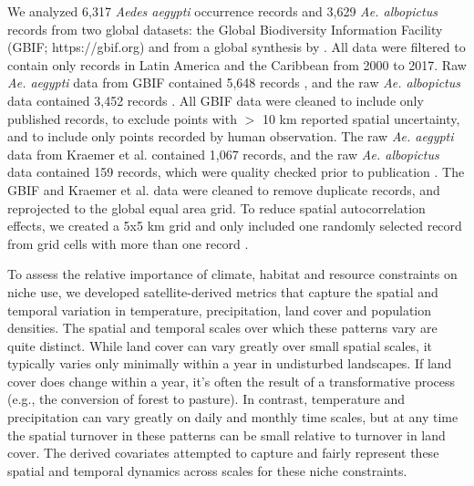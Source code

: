 We analyzed 6,317 \textit{Aedes aegypti} occurrence records and 3,629 \textit{Ae. albopictus} records from two global datasets: the Global Biodiversity Information Facility (GBIF; https://gbif.org) and from a global synthesis by \cite{Kraemer2015-sm}. All data were filtered to contain only records in Latin America and the Caribbean from 2000 to 2017. Raw \textit{Ae. aegypti} data from GBIF contained 5,648 records \cite{Gbif2018-ae}, and the raw \textit{Ae. albopictus} data contained 3,452 records \cite{Gbif2018-aa}. All GBIF data were cleaned to include only published records, to exclude points with $>$ 10 km reported spatial uncertainty, and to include only points recorded by human observation. The raw \textit{Ae. aegypti} data from Kraemer et al. contained 1,067 records, and the raw \textit{Ae. albopictus} data contained 159 records, which were quality checked prior to publication \cite{Kraemer2015-sm}. The GBIF and Kraemer et al. data were cleaned to remove duplicate records, and reprojected to the global equal area grid. To reduce spatial autocorrelation effects, we created a 5x5 km grid and only included one randomly selected record from grid cells with more than one record \cite{Segurado2006-gy, Hawkins2012-gu}.

To assess the relative importance of climate, habitat and resource constraints on niche use, we developed satellite-derived metrics that capture the spatial and temporal variation in temperature, precipitation, land cover and population densities. The spatial and temporal scales over which these patterns vary are quite distinct. While land cover can vary greatly over small spatial scales, it typically varies only minimally within a year in undisturbed landscapes. If land cover does change within a year, it’s often the result of a transformative process (e.g., the conversion of forest to pasture). In contrast, temperature and precipitation can vary greatly on daily and monthly time scales, but at any time the spatial turnover in these patterns can be small relative to turnover in land cover. The derived covariates attempted to capture and fairly represent these spatial and temporal dynamics across scales for these niche constraints.

